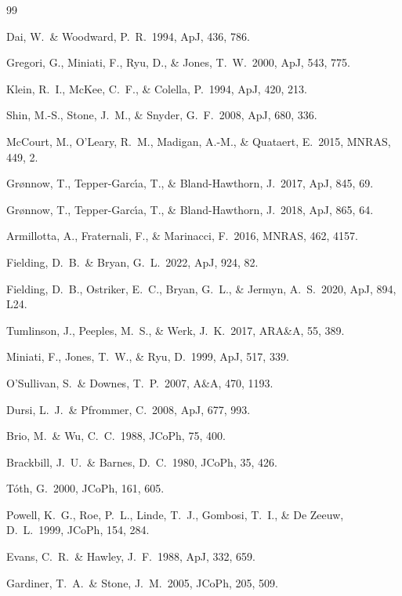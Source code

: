 \documentclass[11pt,a4paper]{article}
\begin{document}
\begin{thebibliography}{99}

 Dai, W.\ \& Woodward, P.\ R.\ 1994, ApJ, 436, 786.

 Gregori, G., Miniati, F., Ryu, D., \& Jones, T.\ W.\ 2000, ApJ, 543, 775.

 Klein, R.\ I., McKee, C.\ F., \& Colella, P.\ 1994, ApJ, 420, 213.

 Shin, M.-S., Stone, J.\ M., \& Snyder, G.\ F.\ 2008, ApJ, 680, 336.

 McCourt, M., O'Leary, R.\ M., Madigan, A.-M., \& Quataert, E.\ 2015, MNRAS, 449, 2.

 Gr{\o}nnow, T., Tepper-Garc{\'\i}a, T., \& Bland-Hawthorn, J.\ 2017, ApJ, 845, 69.

 Gr{\o}nnow, T., Tepper-Garc{\'\i}a, T., \& Bland-Hawthorn, J.\ 2018, ApJ, 865, 64.

 Armillotta, A., Fraternali, F., \& Marinacci, F.\ 2016, MNRAS, 462, 4157.

 Fielding, D.\ B.\ \& Bryan, G.\ L.\ 2022, ApJ, 924, 82.

 Fielding, D.\ B., Ostriker, E.\ C., Bryan, G.\ L., \& Jermyn, A.\ S.\ 2020, ApJ, 894, L24.

 Tumlinson, J., Peeples, M.\ S., \& Werk, J.\ K.\ 2017, ARA\&A, 55, 389.

 Miniati, F., Jones, T.\ W., \& Ryu, D.\ 1999, ApJ, 517, 339.

 O'Sullivan, S.\ \& Downes, T.\ P.\ 2007, A\&A, 470, 1193.

 Dursi, L.\ J.\ \& Pfrommer, C.\ 2008, ApJ, 677, 993.

 Brio, M.\ \& Wu, C.\ C.\ 1988, JCoPh, 75, 400.

 Brackbill, J.\ U.\ \& Barnes, D.\ C.\ 1980, JCoPh, 35, 426.

 T\'oth, G.\ 2000, JCoPh, 161, 605.

 Powell, K.\ G., Roe, P.\ L., Linde, T.\ J., Gombosi, T.\ I., \& De Zeeuw, D.\ L.\ 1999, JCoPh, 154, 284.

 Evans, C.\ R.\ \& Hawley, J.\ F.\ 1988, ApJ, 332, 659.

 Gardiner, T.\ A.\ \& Stone, J.\ M.\ 2005, JCoPh, 205, 509.


\end{thebibliography}
\end{document}
